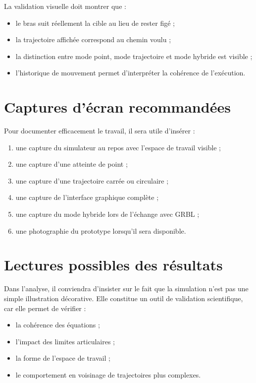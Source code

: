 \documentclass[12pt,a4paper]{report}
\newcommand{\workspace}{espace de travail}
\begin{document}
La validation visuelle doit montrer que :

\begin{itemize}
    \item le bras suit réellement la cible au lieu de rester figé ;
    \item la trajectoire affichée correspond au chemin voulu ;
    \item la distinction entre mode point, mode trajectoire et mode hybride est visible ;
    \item l'historique de mouvement permet d'interpréter la cohérence de l'exécution.
\end{itemize}

\section{Captures d'écran recommandées}

Pour documenter efficacement le travail, il sera utile d'insérer :

\begin{enumerate}[label=\arabic*.]
    \item une capture du simulateur au repos avec l'\workspace{} visible ;
    \item une capture d'une atteinte de point ;
    \item une capture d'une trajectoire carrée ou circulaire ;
    \item une capture de l'interface graphique complète ;
    \item une capture du mode hybride lors de l'échange avec GRBL ;
    \item une photographie du prototype lorsqu'il sera disponible.
\end{enumerate}

\section{Lectures possibles des résultats}

Dans l'analyse, il conviendra d'insister sur le fait que la simulation n'est pas une
simple illustration décorative. Elle constitue un outil de validation scientifique,
car elle permet de vérifier :

\begin{itemize}
    \item la cohérence des équations ;
    \item l'impact des limites articulaires ;
    \item la forme de l'\workspace{} ;
    \item le comportement en voisinage de trajectoires plus complexes.
\end{itemize}
\end{document}
